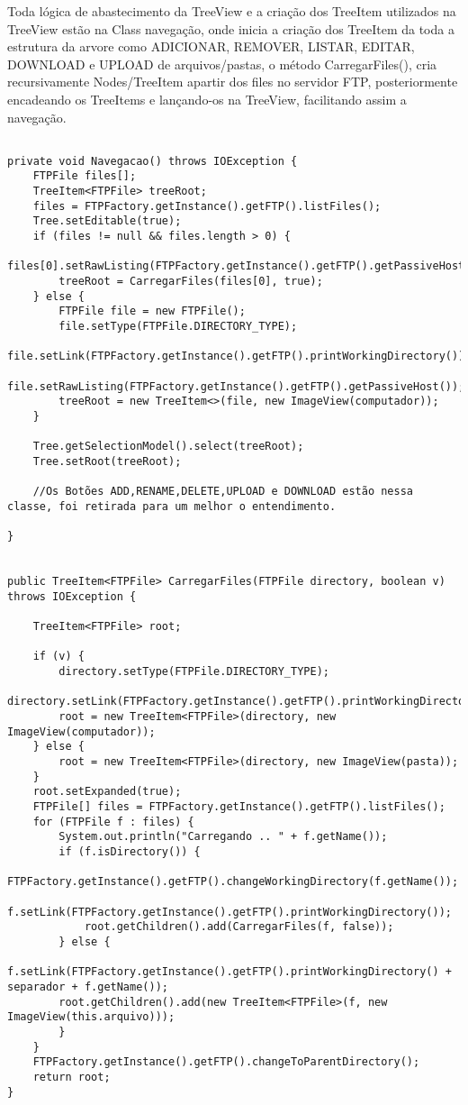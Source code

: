 \documentclass[12pt]{article}
\begin{document}
Toda lógica de abastecimento da TreeView e a criação dos TreeItem utilizados na TreeView estão na Class  navegação, onde inicia a criação dos TreeItem da toda a estrutura da arvore como ADICIONAR, REMOVER, LISTAR, EDITAR, DOWNLOAD e UPLOAD de arquivos/pastas, o método CarregarFiles(), cria recursivamente Nodes/TreeItem apartir dos files no servidor FTP, posteriormente encadeando os TreeItems e lançando-os na TreeView, facilitando assim a navegação.

\begin{lstlisting}

private void Navegacao() throws IOException {
	FTPFile files[];
	TreeItem<FTPFile> treeRoot;
	files = FTPFactory.getInstance().getFTP().listFiles();
	Tree.setEditable(true);
	if (files != null && files.length > 0) {
		files[0].setRawListing(FTPFactory.getInstance().getFTP().getPassiveHost());
		treeRoot = CarregarFiles(files[0], true);
	} else {
		FTPFile file = new FTPFile();
		file.setType(FTPFile.DIRECTORY_TYPE);
		file.setLink(FTPFactory.getInstance().getFTP().printWorkingDirectory());
		file.setRawListing(FTPFactory.getInstance().getFTP().getPassiveHost());
		treeRoot = new TreeItem<>(file, new ImageView(computador));
	}
	
	Tree.getSelectionModel().select(treeRoot);	
	Tree.setRoot(treeRoot);
	
	//Os Botões ADD,RENAME,DELETE,UPLOAD e DOWNLOAD estão nessa classe, foi retirada para um melhor o entendimento.

}


public TreeItem<FTPFile> CarregarFiles(FTPFile directory, boolean v) throws IOException {
	
	TreeItem<FTPFile> root;

	if (v) {
		directory.setType(FTPFile.DIRECTORY_TYPE);
		directory.setLink(FTPFactory.getInstance().getFTP().printWorkingDirectory());
		root = new TreeItem<FTPFile>(directory, new ImageView(computador));
    } else {
		root = new TreeItem<FTPFile>(directory, new ImageView(pasta));
	}
	root.setExpanded(true);
	FTPFile[] files = FTPFactory.getInstance().getFTP().listFiles();
	for (FTPFile f : files) {
		System.out.println("Carregando .. " + f.getName());
	    if (f.isDirectory()) {
			FTPFactory.getInstance().getFTP().changeWorkingDirectory(f.getName());
			f.setLink(FTPFactory.getInstance().getFTP().printWorkingDirectory());
			root.getChildren().add(CarregarFiles(f, false));
		} else {
		f.setLink(FTPFactory.getInstance().getFTP().printWorkingDirectory() + separador + f.getName());
		root.getChildren().add(new TreeItem<FTPFile>(f, new ImageView(this.arquivo)));
		}
	}
	FTPFactory.getInstance().getFTP().changeToParentDirectory(); 
	return root;
}

\end{lstlisting}
\end{document}
